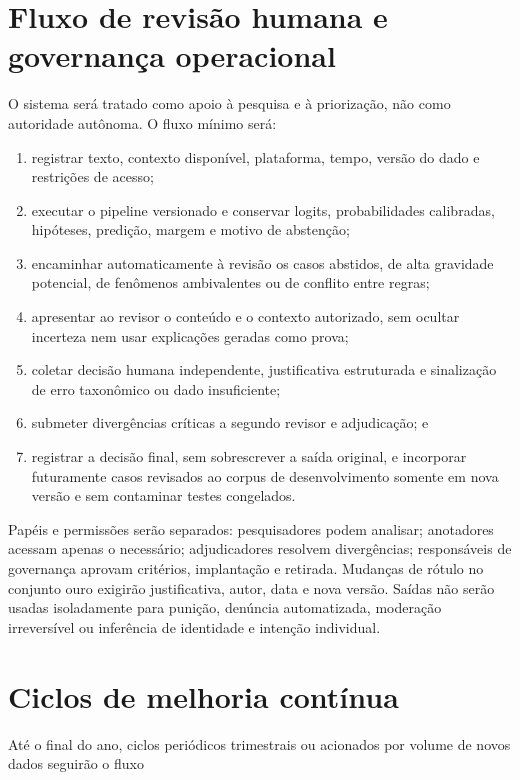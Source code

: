 \section{Fluxo de revisão humana e governança operacional}

O sistema será tratado como apoio à pesquisa e à priorização, não como autoridade autônoma. O fluxo mínimo será:

\begin{enumerate}
\item registrar texto, contexto disponível, plataforma, tempo, versão do dado e restrições de acesso;
\item executar o pipeline versionado e conservar logits, probabilidades calibradas, hipóteses, predição, margem e motivo de abstenção;
\item encaminhar automaticamente à revisão os casos abstidos, de alta gravidade potencial, de fenômenos ambivalentes ou de conflito entre regras;
\item apresentar ao revisor o conteúdo e o contexto autorizado, sem ocultar incerteza nem usar explicações geradas como prova;
\item coletar decisão humana independente, justificativa estruturada e sinalização de erro taxonômico ou dado insuficiente;
\item submeter divergências críticas a segundo revisor e adjudicação; e
\item registrar a decisão final, sem sobrescrever a saída original, e incorporar futuramente casos revisados ao corpus de desenvolvimento somente em nova versão e sem contaminar testes congelados.
\end{enumerate}

Papéis e permissões serão separados: pesquisadores podem analisar; anotadores acessam apenas o necessário; adjudicadores resolvem divergências; responsáveis de governança aprovam critérios, implantação e retirada. Mudanças de rótulo no conjunto ouro exigirão justificativa, autor, data e nova versão. Saídas não serão usadas isoladamente para punição, denúncia automatizada, moderação irreversível ou inferência de identidade e intenção individual.

\section{Ciclos de melhoria contínua}

Até o final do ano, ciclos periódicos trimestrais ou acionados por volume de novos dados seguirão o fluxo

